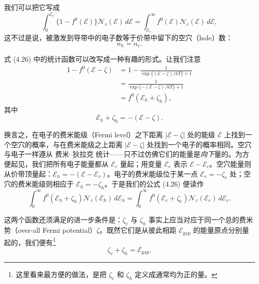 我们可以把它写成
\begin{equation*}
\int_0^{\mathcal{E}_v} \{1-f^0(\mathcal{E})\}\mathcal{N}_v(\mathcal{E})\,d\mathcal{E} = \int_{\mathcal{E}_c}^{\infty} f^0(\mathcal{E})\mathcal{N}_c(\mathcal{E})\,d\mathcal{E},
\tag{4.26}
\end{equation*}
这不过是说，被激发到导带中的电子数等于价带中留下的空穴（hole）数：
\begin{equation*}
n_h = n_e.
\tag{4.27}
\end{equation*}

式 (4.26) 中的统计函数可以改写成一种有趣的形式。让我们注意
\begin{align*}
1-f^0(\mathcal{E}-\zeta) &= 1 - \frac{1}{\exp\{(\mathcal{E}-\zeta)/kT\}+1} \\
&= \frac{1}{\exp\{-(\mathcal{E}-\zeta)/kT\}+1} \\
&= f^0(\mathcal{E}_h+\zeta_h),
\tag{4.28}
\end{align*}
其中
\begin{equation*}
\mathcal{E}_h+\zeta_h = -(\mathcal{E}-\zeta).
\tag{4.29}
\end{equation*}

换言之，在电子的费米能级（Fermi level）之下距离 $|\mathcal{E}-\zeta|$ 处的能级 $\mathcal{E}$ 上找到一个空穴的概率，与在费米能级之上距离 $|\mathcal{E}-\zeta|$ 处找到一个电子的概率相同。空穴与电子一样遵从 费米–狄拉克 统计——只不过仿佛它们的能量是\emph{向下}量的。为方便起见，我们把所有电子能量都从 $\mathcal{E}_c$ 量起；用变量 $\mathcal{E}_e$ 表示 $\mathcal{E}-\mathcal{E}_c$。空穴能量则从价带顶量起：$\mathcal{E}_h=-(\mathcal{E}-\mathcal{E}_v)$。电子的费米能级位于某一点 $\mathcal{E}_e=-\zeta_e$ 处；空穴的费米能级则相应于 $\mathcal{E}_h=-\zeta_h$。于是我们的公式 (4.26) 便读作
\begin{equation*}
\int_0^{\infty} f^0(\mathcal{E}_h+\zeta_h)\mathcal{N}_v(\mathcal{E}_h)\,d\mathcal{E}_h = \int_0^{\infty} f^0(\mathcal{E}_e+\zeta_e)\mathcal{N}_c(\mathcal{E}_e)\,d\mathcal{E}_e.
\tag{4.30}
\end{equation*}

这两个函数还须满足的进一步条件是：$\zeta_e$ 与 $\zeta_h$ 事实上应当对应于同一个总的费米势（over-all Fermi potential）$\zeta$。既然它们是从彼此相距 $\mathcal{E}_{\mathrm{gap}}$ 的能量原点分别量起的，我们便有\footnote{这里看来最方便的做法，是把 $\zeta_e$ 和 $\zeta_h$ 定义成通常均为正的量。}
\begin{equation*}
\zeta_e+\zeta_h = \mathcal{E}_{\mathrm{gap}}.
\tag{4.31}
\end{equation*}

